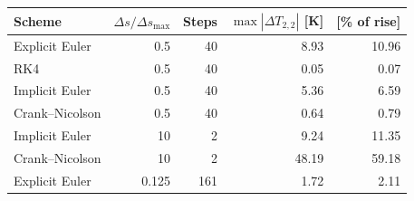 \begin{tabular}{@{}l r r r r@{}}
\toprule
Scheme & $\Delta s/\Delta s_{\max}$ & Steps & $\max|\Delta T_{2,2}|$ [K] & [\% of rise] \\
\midrule
Explicit Euler & 0.5 & 40 & 8.93 & 10.96 \\
RK4 & 0.5 & 40 & 0.05 & 0.07 \\
Implicit Euler & 0.5 & 40 & 5.36 & 6.59 \\
Crank--Nicolson & 0.5 & 40 & 0.64 & 0.79 \\
Implicit Euler & 10 & 2 & 9.24 & 11.35 \\
Crank--Nicolson & 10 & 2 & 48.19 & 59.18 \\
Explicit Euler & 0.125 & 161 & 1.72 & 2.11 \\
\bottomrule
\end{tabular}
